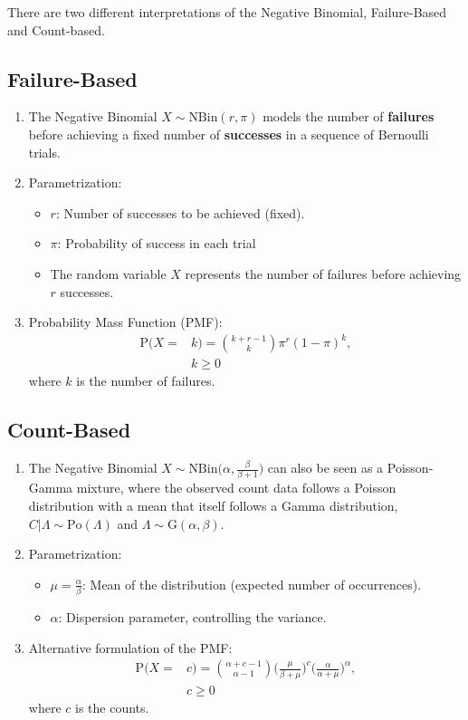There are two different interpretations of the Negative Binomial, Failure-Based and Count-based.
\subsection{Failure-Based}
\begin{enumerate}
\item The Negative Binomial $X\sim\textrm{NBin}(r,\pi)$ models the number of \textbf{failures} before achieving a fixed number of \textbf{successes} in a sequence of Bernoulli trials. 
\item Parametrization:
	\begin{itemize}
	\item $r$: Number of successes to be achieved (fixed).
	\item $\pi$: Probability of success in each trial
	\item The random variable $X$ represents the number of failures before achieving $r$ successes.
	\end{itemize}
\item Probability Mass Function (PMF):
\begin{align*}
\textrm{P}(X=&k) = \binom{k+r-1}{k} \pi^r(1-\pi)^k, \\
&k\geq 0 
\end{align*}
where $k$ is the number of failures.
\end{enumerate}

\subsection{Count-Based}
\begin{enumerate}
\item The Negative Binomial $X\sim\textrm{NBin}\Bigg(\alpha,\frac{\beta}{\beta+1}\Bigg)$ can also be seen as a Poisson-Gamma mixture, where the observed count data follows a Poisson distribution with a mean that itself follows a Gamma distribution, $C|\Lambda \sim \textrm{Po}(\Lambda)$ and $\Lambda \sim \textrm{G}(\alpha,\beta)$. 
\item Parametrization:
	\begin{itemize}
	\item $\mu = \frac{\alpha}{\beta}$: Mean of the distribution (expected number of occurrences).
	\item $\alpha$: Dispersion parameter, controlling the variance.
	\end{itemize}
\item Alternative formulation of the PMF:
\begin{align*}
\textrm{P}(X=&c) = \binom{\alpha+c-1}{\alpha-1}\Bigg (\frac{\mu}{\beta+\mu}\Bigg)^{c} \Bigg(\frac{\alpha}{\alpha+\mu}\Bigg)^{\alpha}, \\
&c\geq 0 
\end{align*}
where $c$ is the counts.
\end{enumerate}

